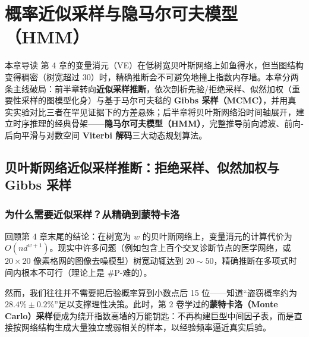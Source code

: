 \chapter[采样推断与隐马尔可夫模型（HMM）]{概率近似采样与隐马尔可夫模型（HMM）}\label{ch:sampling-hmm}

\begin{chapIntro}{本章导读}
第 4 章的变量消元（VE）在低树宽贝叶斯网络上如鱼得水，但当图结构变得稠密（树宽超过 $30$）时，精确推断会不可避免地撞上指数内存墙。本章分两条主线破局：前半章转向\textbf{近似采样推断}，依次剖析先验/拒绝采样、似然加权（重要性采样的图模型化身）与基于马尔可夫毯的 \textbf{Gibbs 采样（MCMC）}，并用真实实验对比三者在罕见证据下的方差悬殊；后半章将贝叶斯网络沿时间轴展开，建立时序推理的经典骨架——\textbf{隐马尔可夫模型（HMM）}，完整推导前向滤波、前向-后向平滑与对数空间 \textbf{Viterbi 解码}三大动态规划算法。
\end{chapIntro}

\section{贝叶斯网络近似采样推断：拒绝采样、似然加权与 Gibbs 采样}\label{sec:bn-sampling}

\subsection{为什么需要近似采样？从精确到蒙特卡洛}

回顾第 4 章末尾的结论：在树宽为 $w$ 的贝叶斯网络上，变量消元的计算代价为 $O(n d^{w+1})$。现实中许多问题（例如包含上百个交叉诊断节点的医学网络，或 $20\times 20$ 像素格网的图像去噪模型）树宽动辄达到 $20\sim 50$，精确推断在多项式时间内根本不可行（理论上是 \#P-难的）。

然而，我们往往并不需要把后验概率算到小数点后 15 位——知道“盗窃概率约为 $28.4\% \pm 0.2\%$”足以支撑理性决策。此时，第 2 卷学过的\textbf{蒙特卡洛（Monte Carlo）采样}便成为绕开指数高墙的万能钥匙：不再构建巨型中间因子表，而是直接按网络结构生成大量独立或弱相关的样本，以经验频率逼近真实后验。

